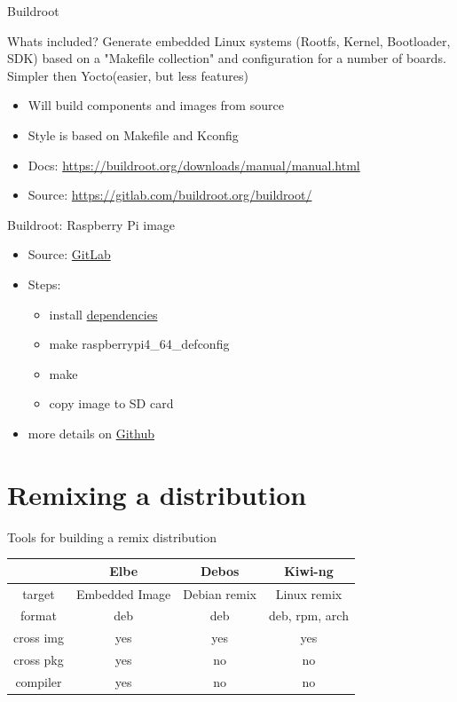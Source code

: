\documentclass{beamer}
\begin{document}
\begin{frame}{Buildroot}
	\begin{block}{Whats included?}
		Generate embedded Linux systems (Rootfs, Kernel, Bootloader, SDK)  based on a "Makefile collection" and configuration for a number of boards. Simpler then Yocto(easier, but less features)
	\end{block}
	\begin{itemize}
		\item Will build components and images from source
		\item Style is based on Makefile and Kconfig 
		\item Docs: \url{https://buildroot.org/downloads/manual/manual.html}
		\item Source: \url{https://gitlab.com/buildroot.org/buildroot/}
	\end{itemize}
\end{frame}

\begin{frame}{Buildroot: Raspberry Pi image}
	\begin{itemize}
		\item Source: \href{https://gitlab.com/buildroot.org/buildroot/}{GitLab}
		\item Steps:
		\begin{itemize}
			\item install \href{https://buildroot.org/downloads/manual/manual.html\#requirement}{dependencies}
			\item make raspberrypi4\_64\_defconfig
			\item make
			\item copy image to SD card
		\end{itemize}
		\item more details on \href{https://github.com/tomirgang/eh21_maintainable_linux/tree/main/examples/first_build_rpi4/buildroot}{Github}
	\end{itemize}
\end{frame}

\section{Remixing a distribution}

\begin{frame}{Tools for building a remix distribution}
	\begin{tabular}{c|ccc}
		& \textbf{Elbe} & \textbf{Debos} & \textbf{Kiwi-ng} \\
		\hline
		target & Embedded Image & Debian remix & Linux remix \\ 
		format & deb & deb & deb, rpm, arch \\
		cross img & yes & yes & yes \\
		cross pkg & yes & no & no \\
		compiler & yes & no & no \\
	\end{tabular}
\end{frame}
\end{document}
